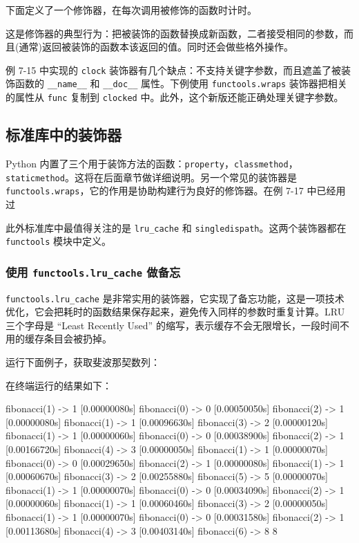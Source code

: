 下面定义了一个修饰器，在每次调用被修饰的函数时计时。



这是修饰器的典型行为：把被装饰的函数替换成新函数，二者接受相同的参数，而且(通常)返回被装饰的函数本该返回的值。同时还会做些格外操作。

例 7-15 中实现的 \texttt{clock} 装饰器有几个缺点：不支持关键字参数，而且遮盖了被装饰函数的 \texttt{\_\_name\_\_} 和 \texttt{\_\_doc\_\_} 属性。下例使用 \texttt{functools.wraps} 装饰器把相关的属性从 \texttt{func} 复制到 \texttt{clocked} 中。此外，这个新版还能正确处理关键字参数。



\subsection{标准库中的装饰器}

Python 内置了三个用于装饰方法的函数：\texttt{property}，\texttt{classmethod}，\texttt{staticmethod}。这将在后面章节做详细说明。另一个常见的装饰器是 \texttt{functools.wraps}，它的作用是协助构建行为良好的修饰器。在例 7-17 中已经用过

此外标准库中最值得关注的是 \texttt{lru\_cache} 和 \texttt{singledispath}。这两个装饰器都在 \texttt{functools} 模块中定义。

\subsubsection{使用 \texttt{functools.lru\_cache} 做备忘}

\texttt{functools.lru\_cache} 是非常实用的装饰器，它实现了备忘功能，这是一项技术优化，它会把耗时的函数结果保存起来，避免传入同样的参数时重复计算。LRU 三个字母是 ``Least Recently Used'' 的缩写，表示缓存不会无限增长，一段时间不用的缓存条目会被扔掉。

运行下面例子，获取斐波那契数列：



在终端运行的结果如下：
\begin{python}
    [0.00000040s] fibonacci(1) -> 1
    [0.00000080s] fibonacci(0) -> 0
    [0.00050050s] fibonacci(2) -> 1
    [0.00000080s] fibonacci(1) -> 1
    [0.00096630s] fibonacci(3) -> 2
    [0.00000120s] fibonacci(1) -> 1
    [0.00000060s] fibonacci(0) -> 0
    [0.00038900s] fibonacci(2) -> 1
    [0.00166720s] fibonacci(4) -> 3
    [0.00000050s] fibonacci(1) -> 1
    [0.00000070s] fibonacci(0) -> 0
    [0.00029650s] fibonacci(2) -> 1
    [0.00000080s] fibonacci(1) -> 1
    [0.00060670s] fibonacci(3) -> 2
    [0.00255880s] fibonacci(5) -> 5
    [0.00000070s] fibonacci(1) -> 1
    [0.00000070s] fibonacci(0) -> 0
    [0.00034090s] fibonacci(2) -> 1
    [0.00000060s] fibonacci(1) -> 1
    [0.00060460s] fibonacci(3) -> 2
    [0.00000050s] fibonacci(1) -> 1
    [0.00000070s] fibonacci(0) -> 0
    [0.00031580s] fibonacci(2) -> 1
    [0.00113680s] fibonacci(4) -> 3
    [0.00403140s] fibonacci(6) -> 8
    8
\end{python}

